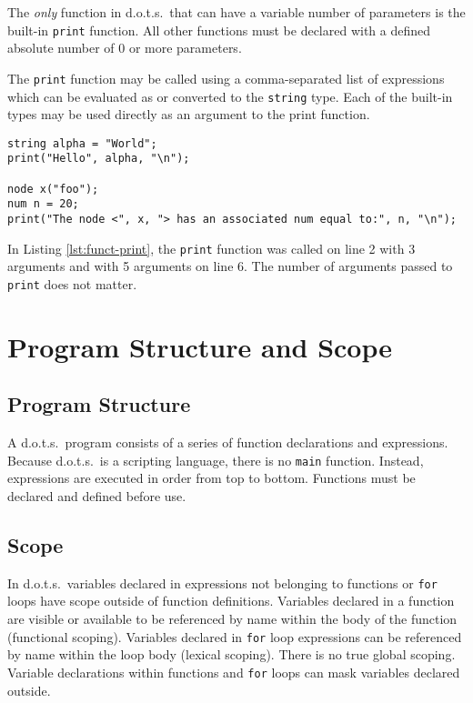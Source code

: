 \documentclass{article}
\newcommand{\pltlang}{d.o.t.s.} %
\newcommand{\code}[1]{\texttt{#1}} %
\begin{document}
The \emph{only} function in \pltlang\ that can have a variable number of parameters is the built-in \code{print} function. All other functions must be declared with a defined absolute number of 0 or more parameters. 

The \code{print} function may be called using a comma-separated list of expressions which can be evaluated as or converted to the \code{string} type. Each of the built-in types may be used directly as an argument to the print function.

\begin{lstlisting}[language=pltLang, caption=The built-in ``print'' function., label=lst:funct-print]
string alpha = "World";
print("Hello", alpha, "\n");

node x("foo");
num n = 20;
print("The node <", x, "> has an associated num equal to:", n, "\n");
\end{lstlisting}

In Listing \ref{lst:funct-print}, the \code{print} function was called on line 2 with 3 arguments and with 5 arguments on line 6. The number of arguments passed to \code{print} does not matter. 

\section{Program Structure and Scope}

\subsection{Program Structure}

A \pltlang\ program consists of a series of function declarations and expressions. Because \pltlang\ is a scripting language, there is no \code{main} function. Instead, expressions are executed in order from top to bottom. Functions must be declared and defined before use. 

\subsection{Scope}

In \pltlang\, variables declared in expressions not belonging to functions or \code{for} loops have scope outside of function definitions. Variables declared in a function are visible or available to be referenced by name within the body of the function (functional scoping). Variables declared in \code{for} loop expressions can be referenced by name within the loop body (lexical scoping). There is no true global scoping. Variable declarations within functions and \code{for} loops can mask variables declared outside.
\end{document}
